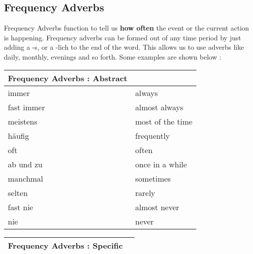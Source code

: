 \documentclass[a4paper,12pt]{article}
\begin{document}
\subsection{\bf{Frequency Adverbs}}
\begin{adjustwidth}{2em}{0pt}
\label{sec:frequency_adverbs}

Frequency Adverbs function to tell us \textbf {how often} the event or the
current action is happening. Frequency adverbs can be formed out of any time
period by just adding a -s, or a -lich to the end of the word. This allows us to
use adverbs like daily, monthly, evenings and so forth. Some examples are shown
below :

\begin{minipage}{0.45\textwidth}
\vspace{0.3cm}
\begin{tabular}{l|l}
\toprule
\rowcolor{goethe_green}
\multicolumn{2}{c}
{\color{white} \textbf{Frequency Adverbs : Abstract} \color{black}} \\
\midrule

\rowcolor{white}     immer      & always \\
\rowcolor{lightgray} fast immer & almost always \\
\rowcolor{white}     meistens   & most of the time \\
\rowcolor{lightgray} häufig     & frequently \\
\rowcolor{white}     oft        & often \\
\rowcolor{lightgray} ab und zu  & once in a while \\
\rowcolor{white}     manchmal   & sometimes \\
\rowcolor{lightgray} selten     & rarely \\
\rowcolor{white}     fast nie   & almost never \\
\rowcolor{lightgray} nie        & never \\

\bottomrule
\end{tabular}

\vspace{0.3cm}
\end{minipage}
\begin{minipage}{0.45\textwidth}
\vspace{0.3cm}
\begin{tabular}{l|l}
\toprule
\rowcolor{goethe_green}
\multicolumn{2}{c}
{\color{white} \textbf{Frequency Adverbs : Specific} \color{black}} \\
\midrule


\end{tabular}
\end{minipage}
\end{adjustwidth}
\end{document}
